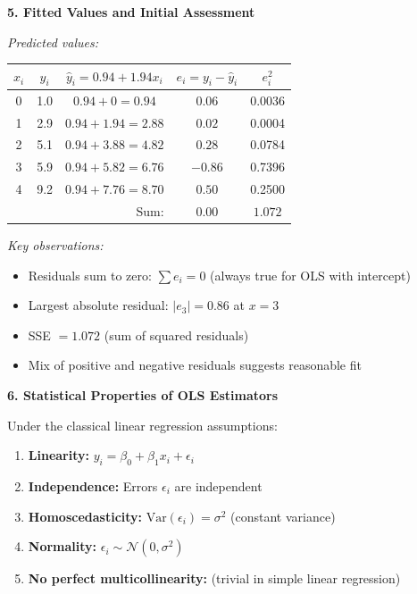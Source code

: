 \documentclass[12pt]{article}
\begin{document}
\begin{explanation}
\textbf{5. Fitted Values and Initial Assessment}

\textit{Predicted values:}

\begin{center}
\begin{tabular}{|c|c|c|c|c|}
\hline
$x_i$ & $y_i$ & $\hat{y}_i = 0.94 + 1.94x_i$ & $e_i = y_i - \hat{y}_i$ & $e_i^2$ \\
\hline
0 & 1.0 & $0.94 + 0 = 0.94$ & $0.06$ & 0.0036 \\
1 & 2.9 & $0.94 + 1.94 = 2.88$ & $0.02$ & 0.0004 \\
2 & 5.1 & $0.94 + 3.88 = 4.82$ & $0.28$ & 0.0784 \\
3 & 5.9 & $0.94 + 5.82 = 6.76$ & $-0.86$ & 0.7396 \\
4 & 9.2 & $0.94 + 7.76 = 8.70$ & $0.50$ & 0.2500 \\
\hline
\multicolumn{3}{|r|}{Sum:} & $0.00$ & $1.072$ \\
\hline
\end{tabular}
\end{center}

\textit{Key observations:}
\begin{itemize}
    \item Residuals sum to zero: $\sum e_i = 0$ (always true for OLS with intercept)
    \item Largest absolute residual: $|e_3| = 0.86$ at $x = 3$
    \item SSE $= 1.072$ (sum of squared residuals)
    \item Mix of positive and negative residuals suggests reasonable fit
\end{itemize}

\textbf{6. Statistical Properties of OLS Estimators}

Under the classical linear regression assumptions:
\begin{enumerate}
    \item \textbf{Linearity:} $y_i = \beta_0 + \beta_1 x_i + \epsilon_i$
    \item \textbf{Independence:} Errors $\epsilon_i$ are independent
    \item \textbf{Homoscedasticity:} $\text{Var}(\epsilon_i) = \sigma^2$ (constant variance)
    \item \textbf{Normality:} $\epsilon_i \sim \mathcal{N}(0, \sigma^2)$
    \item \textbf{No perfect multicollinearity:} (trivial in simple linear regression)
\end{enumerate}


\end{explanation}
\end{document}
